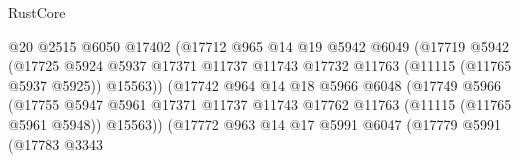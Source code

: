 \begin{lexlean}{RustCore}
\begin{coremodule}
                                        @20
                                        @2515
                                        @6050
                                        @17402
                                        (@17712
                                          @965
                                          @14
                                          @19
                                          @5942
                                          @6049
                                          (@17719
                                            @5942
                                            (@17725
                                              @5924
                                              @5937
                                              @17371
                                              @11737
                                              @11743
                                              @17732
                                              @11763
                                              (@11115 (@11765 @5937 @5925))
                                              @15563))
                                          (@17742
                                            @964
                                            @14
                                            @18
                                            @5966
                                            @6048
                                            (@17749
                                              @5966
                                              (@17755
                                                @5947
                                                @5961
                                                @17371
                                                @11737
                                                @11743
                                                @17762
                                                @11763
                                                (@11115 (@11765 @5961 @5948))
                                                @15563))
                                            (@17772
                                              @963
                                              @14
                                              @17
                                              @5991
                                              @6047
                                              (@17779
                                                @5991
                                                (@17783
                                                  @3343

\end{coremodule}
\end{lexlean}
